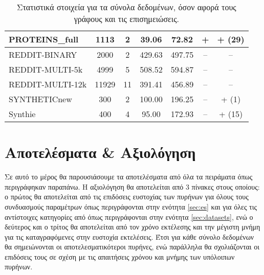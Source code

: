 \begin{table}[]
\begin{adjustbox}{angle=90}
{{\begin{tabularx}{0.853\textheight}{|l|c|c|c|c|c|c|}
PROTEINS\_full                & 1113           & 2               & 39.06                & 72.82                & +           & + (29)                            \\ \hline
REDDIT-BINARY                 & 2000           & 2               & 429.63               & 497.75               & –           & –                                 \\ \hline
REDDIT-MULTI-5k               & 4999           & 5               & 508.52               & 594.87               & –           & –                                 \\ \hline
REDDIT-MULTI-12k              & 11929          & 11              & 391.41               & 456.89               & –           & –                                 \\ \hline
SYNTHETICnew                  & 300            & 2               & 100.00               & 196.25               & –           & + (1)                             \\ \hline
Synthie                       & 400            & 4               & 95.00                & 172.93               & –           & + (15)                            \\ \hline
\end{tabularx}
}
}
\end{adjustbox}
\caption{Στατιστικά στοιχεία για τα σύνολα δεδομένων, όσον αφορά τους γράφους και τις επισημειώσεις.}
\label{ref:dataset_statistics}
\end{table}\newpage
\section{Αποτελέσματα \& Αξιολόγηση}
Σε αυτό το μέρος θα παρουσιάσουμε τα αποτελέσματα από όλα τα πειράματα όπως περιγράφηκαν παραπάνω.
Η αξιολόγηση θα αποτελείται από 3 πίνακες στους οποίους: ο πρώτος θα αποτελείται από τις επιδόσεις ευστοχίας των πυρήνων για όλους τους συνδυασμούς παραμέτρων όπως περιγράφονται στην ενότητα \ref{sec:es} και για όλες τις αντίστοιχες κατηγορίες από  όπως περιγράφονται στην ενότητα \ref{sec:datasets}, ενώ ο δεύτερος και ο τρίτος θα αποτελείται από τον χρόνο εκτέλεσης και την μέγιστη μνήμη για τις καταγραφόμενες στην ευστοχία εκτελέσεις.
Έτσι για κάθε σύνολο δεδομένων θα σημειώνονται οι αποτελεσματικότεροι πυρήνες, ενώ παράλληλα θα σχολιάζονται οι επιδόσεις τους σε σχέση με τις απαιτήσεις χρόνου και μνήμης των υπόλοιπων πυρήνων.
